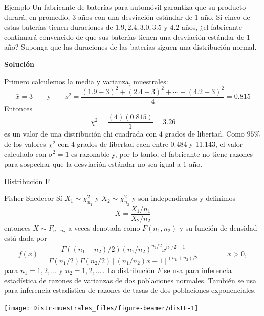 \documentclass[
  10pt,
  ignorenonframetext,
]{beamer}
\begin{document}
\begin{frame}{}
\protect\hypertarget{section-54}{}
\begin{block}{Ejemplo}
\protect\hypertarget{ejemplo-2}{}
Un fabricante de baterías para automóvil garantiza que su producto
durará, en promedio, \(3\) años con una desviación estándar de \(1\)
año. Si cinco de estas baterías tienen duraciones de
\(1.9, 2.4, 3.0, 3.5\mbox{ y }4.2\) años, ¿el fabricante continuará
convencido de que sus baterías tienen una desviación estándar de \(1\)
año? Suponga que las duraciones de las baterías siguen una distribución
normal.

\textbf{Solución}

Primero calculemos la media y varianza, muestrales:
\[\bar{x}=3 \qquad \mbox{y} \qquad s^2 = \frac{(1.9-3)^2 + (2.4-3)^2 + \cdots + (4.2-3)^2}{4}=0.815\]
Entonces \[\chi^2=\frac{(4)(0.815)}{1}=3.26\] es un valor de una
distribución chi cuadrada con \(4\) grados de libertad. Como \(95\%\) de
los valores \(\chi^2\) con \(4\) grados de libertad caen entre 0.484 y
11.143, el valor calculado con \(\sigma^2 = 1\) es razonable y, por lo
tanto, el fabricante no tiene razones para sospechar que la desviación
estándar no sea igual a \(1\) año.
\end{block}
\end{frame}

\begin{frame}{Distribución F}
\protect\hypertarget{distribuciuxf3n-f}{}
\begin{block}{Fisher-Snedecor}
\protect\hypertarget{fisher-snedecor}{}
Sí \(X_1 \sim \chi_{n_1}^2\) y \(X_2 \sim \chi_{n_2}^2\) y son
independientes y definimos \[X=\frac{X_1/n_1}{X_2/n_2}\] entonces
\(X \sim F_{n_1,n_2}\) a veces denotada como \(F(n_{1},n_{2})\) y su
función de densidad está dada por \[
f(x) = \frac{\Gamma((n_{1}+n_{2})/2)(n_{1}/n_{2})^{n_{1}/2}x^{n_{1}/2-1}}
{\Gamma(n_{1}/2)\Gamma(n_{2}/2)[(n_{1}/n_{2})x+1]^{(n_{1}+n_{2})/2}} \qquad \qquad x > 0,
\] para \(n_{1} = 1,2,\ldots\) y \(n_{2} = 1,2,\ldots \,\). La
distribución \(F\) se usa para inferencia estadística de razones de
varianzas de dos poblaciones normales. También se usa para inferencia
estadística de razones de tasas de dos poblaciones exponenciales.
\end{block}
\end{frame}

\begin{frame}{}
\protect\hypertarget{section-55}{}
\begin{center}\texttt{[image: Distr-muestrales\_files/figure-beamer/distF-1]} \end{center}
\end{frame}
\end{document}

